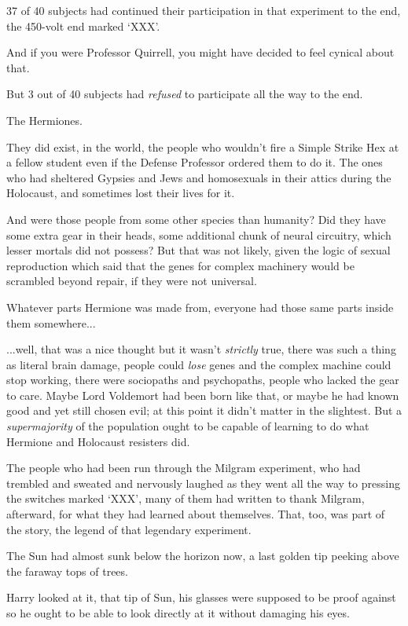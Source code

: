 37 of 40 subjects had continued their participation in that experiment to the end, the 450-volt end marked ‘XXX’.

And if you were Professor Quirrell, you might have decided to feel cynical about that.

But 3 out of 40 subjects had \emph{refused} to participate all the way to the end.

The Hermiones.

They did exist, in the world, the people who wouldn’t fire a Simple Strike Hex at a fellow student even if the Defense Professor ordered them to do it. The ones who had sheltered Gypsies and Jews and homosexuals in their attics during the Holocaust, and sometimes lost their lives for it.

And were those people from some other species than humanity? Did they have some extra gear in their heads, some additional chunk of neural circuitry, which lesser mortals did not possess? But that was not likely, given the logic of sexual reproduction which said that the genes for complex machinery would be scrambled beyond repair, if they were not universal.

Whatever parts Hermione was made from, everyone had those same parts inside them somewhere...

...well, that was a nice thought but it wasn’t \emph{strictly} true, there was such a thing as literal brain damage, people could \emph{lose} genes and the complex machine could stop working, there were sociopaths and psychopaths, people who lacked the gear to care. Maybe Lord Voldemort had been born like that, or maybe he had known good and yet still chosen evil; at this point it didn’t matter in the slightest. But a \emph{supermajority} of the population ought to be capable of learning to do what Hermione and Holocaust resisters did.

The people who had been run through the Milgram experiment, who had trembled and sweated and nervously laughed as they went all the way to pressing the switches marked ‘XXX’, many of them had written to thank Milgram, afterward, for what they had learned about themselves. That, too, was part of the story, the legend of that legendary experiment.

The Sun had almost sunk below the horizon now, a last golden tip peeking above the faraway tops of trees.

Harry looked at it, that tip of Sun, his glasses were supposed to be proof against  so he ought to be able to look directly at it without damaging his eyes.

